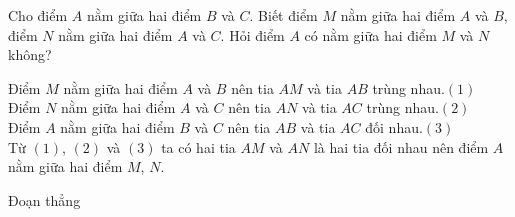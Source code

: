 \begin{vd}%
	Cho điểm $A$ nằm giữa hai điểm $B$ và $C$. Biết điểm $M$ nằm giữa hai điểm $A$ và $B$, điểm $N$ nằm giữa hai điểm $A$ và $C$. Hỏi điểm $A$ có nằm giữa hai điểm $M$ và $N$ không?
	\loigiai
	{
		\begin{center}
		\end{center}
		Điểm $M$ nằm giữa hai điểm $A$ và $B$ nên tia $AM$ và tia $AB$ trùng nhau.\hfill$(1)$\\
		Điểm $N$ nằm giữa hai điểm $A$ và $C$ nên tia $AN$ và tia $AC$ trùng nhau.\hfill$(2)$\\
		Điểm $A$ nằm giữa hai điểm $B$ và $C$ nên tia $AB$ và tia $AC$ đối nhau.\hfill$(3)$\\
		Từ $(1)$, $(2)$ và $(3)$ ta có hai tia $AM$ và $AN$ là hai tia đối nhau nên điểm $A$ nằm giữa hai điểm $M$, $N$.
	}
\end{vd}

\begin{dang}{Đoạn thẳng}
	
\end{dang}

